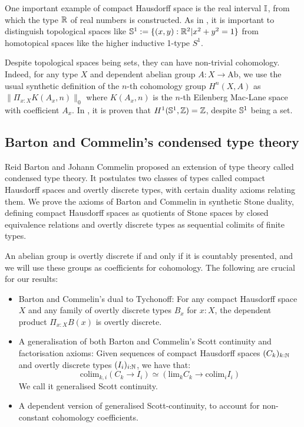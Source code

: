 \documentclass{../util/zariski}
\begin{document}
One important example of compact Hausdorff space is the real interval $\mathbb{I}$, from which the type $\mathbb{R}$  of real numbers is constructed.
As in \cite{shulman-Brouwer-fixed-point}, it is important to distinguish topological spaces like $\mathbb{S}^1:=\{(x,y):\mathbb{R}^2\vert x^2+y^2=1\}$ from homotopical spaces like the higher inductive 1-type $S^1$.

Despite topological spaces being sets, they can have non-trivial cohomology. Indeed, for any type $X$ and dependent abelian group $A:X\to \mathrm{Ab}$, we use the usual synthetic definition of the $n$-th cohomology group $H^n(X,A)$ as $\|\Pi_{x:X}K(A_x,n)\|_0$ where $K(A_x,n)$ is the $n$-th Eilenberg Mac-Lane space with coefficient $A_x$. In \cite{synthetic-stone-duality}, it is proven that $H^1(\mathbb{S}^1,\mathbb{Z})=\mathbb{Z}$, despite $\mathbb{S}^1$ being a set.

\subsection*{Barton and Commelin's condensed type theory}

Reid Barton and Johann Commelin proposed an extension of type theory called condensed type theory. It postulates two classes of types called compact Hausdorff spaces and overtly discrete types, with certain duality axioms relating them. We prove the axioms of Barton and Commelin in synthetic Stone duality, defining compact Hausdorff spaces as quotients of Stone spaces by closed equivalence relations and overtly discrete types as sequential colimits of finite types.

An abelian group is overtly discrete if and only if it is countably presented, and we will use these groups as coefficients for cohomology. The following are crucial for our results:
\begin{itemize} 
\item Barton and Commelin's dual to Tychonoff: For any compact Hausdorff space $X$ and any family of overtly discrete types $B_x$ for $x:X$, the dependent product $\Pi_{x:X}B(x)$ is overtly discrete.
\item A generalisation of both Barton and Commelin's Scott continuity and factorisation axioms: Given sequences of compact Hausdorff spaces $(C_k)_{k:\mathbb{N}}$ and overtly discrete types $(I_i)_{i:\mathbb{N}}$, we have that:
\[\mathrm{colim}_{k,i}(C_k\to I_i) \simeq \left(\mathrm{lim}_kC_k \to \mathrm{colim}_iI_i\right)\]
We call it generalised Scott continuity.
\item A dependent version of generalised Scott-continuity, to account for non-constant cohomology coefficients.
\end{itemize}
\end{document}
